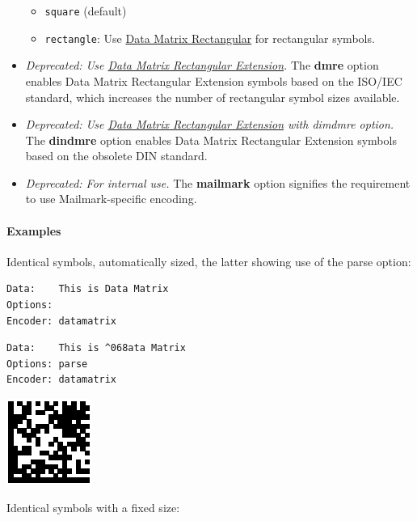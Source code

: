 \begin{itemize}
  \begin{itemize}
  \tightlist
  \item
    \texttt{square} (default)
  \item
    \texttt{rectangle}: Use
    \protect\hyperlink{data-matrix-rectangular}{Data Matrix Rectangular}
    for rectangular symbols.
  \end{itemize}
\item
  \emph{Deprecated: Use
  \protect\hyperlink{data-matrix-rectangular-extension}{Data Matrix
  Rectangular Extension}.} The \textbf{dmre} option enables Data Matrix
  Rectangular Extension symbols based on the ISO/IEC standard, which
  increases the number of rectangular symbol sizes available.
\item
  \emph{Deprecated: Use
  \protect\hyperlink{data-matrix-rectangular-extension}{Data Matrix
  Rectangular Extension} with dimdmre option.} The \textbf{dindmre}
  option enables Data Matrix Rectangular Extension symbols based on the
  obsolete DIN standard.
\item
  \emph{Deprecated: For internal use.} The \textbf{mailmark} option
  signifies the requirement to use Mailmark-specific encoding.
\end{itemize}

\hypertarget{examples-6}{%
\paragraph{Examples}\label{examples-6}}

Identical symbols, automatically sized, the latter showing use of the
parse option:

\begin{verbatim}
Data:    This is Data Matrix
Options: 
Encoder: datamatrix
\end{verbatim}

\begin{verbatim}
Data:    This is ^068ata Matrix
Options: parse
Encoder: datamatrix
\end{verbatim}

\includegraphics{images/datamatrix-1.eps}

Identical symbols with a fixed size:

